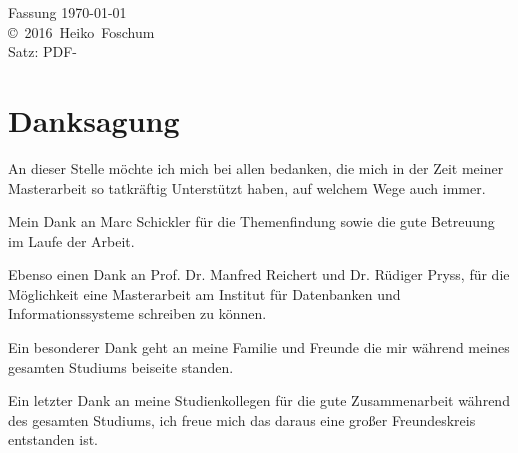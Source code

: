 \documentclass[a4paper,10pt,twoside,openright,DIV=15,BCOR25mm
]{scrbook}
\newcommand{\fullname}{Heiko~Foschum}
\newcommand{\jahr}{2016}
\begin{document}
\clearpage
\thispagestyle{empty}
{ \small
  \flushleft
  Fassung \today \\\vfill
  \copyright~\jahr~\fullname\\[0.5em]
  Satz: PDF-\LaTeXe
}


\chapter*{Danksagung}
An dieser Stelle möchte ich mich bei allen bedanken, die mich in der Zeit meiner Masterarbeit so tatkräftig Unterstützt haben, auf welchem Wege auch immer. 

Mein Dank an Marc Schickler für die Themenfindung sowie die gute Betreuung im Laufe der Arbeit.

Ebenso einen Dank an Prof. Dr. Manfred Reichert und Dr. Rüdiger Pryss, für die Möglichkeit eine Masterarbeit am Institut für Datenbanken und Informationssysteme schreiben zu können. 

Ein besonderer Dank geht an meine Familie und Freunde die mir während meines gesamten Studiums beiseite standen.

Ein letzter Dank an meine Studienkollegen für die gute Zusammenarbeit während des gesamten Studiums, ich freue mich das daraus eine großer Freundeskreis entstanden ist.

\tableofcontents






\mainmatter









\end{document}
